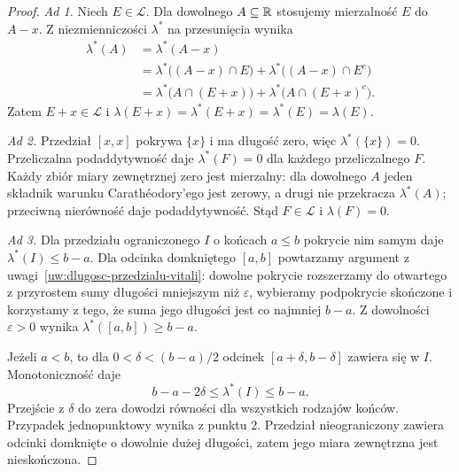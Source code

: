\begin{proof}
\emph{Ad 1.}
Niech $E\in\mathcal{L}$. Dla dowolnego $A\subseteq\mathbb{R}$ stosujemy
mierzalność $E$ do $A-x$. Z niezmienniczości $\lambda^{\ast}$
na przesunięcia wynika
\begin{align*}
  \lambda^{\ast}(A)
    &=\lambda^{\ast}(A-x)\\
    &=\lambda^{\ast}\bigl((A-x)\cap E\bigr)
      +\lambda^{\ast}\bigl((A-x)\cap E^c\bigr)\\
    &=\lambda^{\ast}\bigl(A\cap(E+x)\bigr)
      +\lambda^{\ast}\bigl(A\cap(E+x)^c\bigr).
\end{align*}
Zatem $E+x\in\mathcal{L}$ i
$\lambda(E+x)=\lambda^{\ast}(E+x)=\lambda^{\ast}(E)=\lambda(E)$.

\emph{Ad 2.}
Przedział $[x,x]$ pokrywa $\{x\}$ i ma długość zero,
więc $\lambda^{\ast}(\{x\})=0$.
Przeliczalna podaddytywność daje $\lambda^{\ast}(F)=0$
dla każdego przeliczalnego $F$.
Każdy zbiór miary zewnętrznej zero jest mierzalny:
dla dowolnego $A$ jeden składnik warunku Carathéodory'ego jest zerowy,
a drugi nie przekracza $\lambda^{\ast}(A)$; przeciwną nierówność
daje podaddytywność. Stąd $F\in\mathcal{L}$ i $\lambda(F)=0$.

\emph{Ad 3.}
Dla przedziału ograniczonego $I$ o końcach $a\leq b$ pokrycie nim samym
daje $\lambda^{\ast}(I)\leq b-a$.
Dla odcinka domkniętego $[a,b]$ powtarzamy argument
z uwagi~\ref{uw:dlugosc-przedzialu-vitali}:
dowolne pokrycie rozszerzamy do otwartego z przyrostem sumy długości
mniejszym niż $\varepsilon$, wybieramy podpokrycie skończone
i korzystamy z tego, że suma jego długości jest co najmniej $b-a$.
Z dowolności $\varepsilon>0$ wynika
$\lambda^{\ast}([a,b])\geq b-a$.

Jeżeli $a<b$, to dla $0<\delta<(b-a)/2$ odcinek
$[a+\delta,b-\delta]$ zawiera się w $I$. Monotoniczność daje
\[
  b-a-2\delta\leq\lambda^{\ast}(I)\leq b-a.
\]
Przejście z $\delta$ do zera dowodzi równości dla wszystkich rodzajów
końców. Przypadek jednopunktowy wynika z punktu 2.
Przedział nieograniczony zawiera odcinki domknięte o dowolnie dużej
długości, zatem jego miara zewnętrzna jest nieskończona.


\end{proof}
